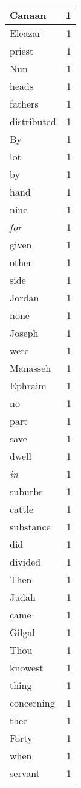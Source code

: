 \begin{center}
\begin{longtable}{l|r}
Canaan & 1\\ \hline 
Eleazar & 1\\ \hline 
priest & 1\\ \hline 
Nun & 1\\ \hline 
heads & 1\\ \hline 
fathers & 1\\ \hline 
distributed & 1\\ \hline 
By & 1\\ \hline 
lot & 1\\ \hline 
by & 1\\ \hline 
hand & 1\\ \hline 
nine & 1\\ \hline 
\emph{for} & 1\\ \hline 
given & 1\\ \hline 
other & 1\\ \hline 
side & 1\\ \hline 
Jordan & 1\\ \hline 
none & 1\\ \hline 
Joseph & 1\\ \hline 
were & 1\\ \hline 
Manasseh & 1\\ \hline 
Ephraim & 1\\ \hline 
no & 1\\ \hline 
part & 1\\ \hline 
save & 1\\ \hline 
dwell & 1\\ \hline 
\emph{in} & 1\\ \hline 
suburbs & 1\\ \hline 
cattle & 1\\ \hline 
substance & 1\\ \hline 
did & 1\\ \hline 
divided & 1\\ \hline 
Then & 1\\ \hline 
Judah & 1\\ \hline 
came & 1\\ \hline 
Gilgal & 1\\ \hline 
Thou & 1\\ \hline 
knowest & 1\\ \hline 
thing & 1\\ \hline 
concerning & 1\\ \hline 
thee & 1\\ \hline 
Forty & 1\\ \hline 
when & 1\\ \hline 
servant & 1\\ \hline 

\end{longtable}
\end{center}
